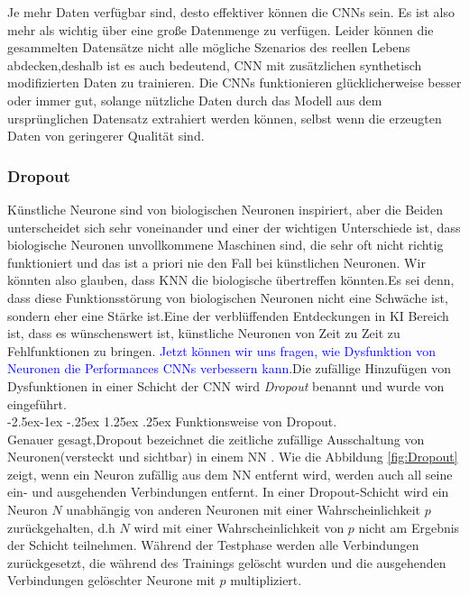 \documentclass[12pt,a4paper]{scrartcl}
\makeatletter
\numberwithin{equation}{section}
\renewcommand\paragraph{\@startsection{paragraph}{4}{\z@}%
	{-2.5ex\@plus -1ex \@minus -.25ex}%
	{1.25ex \@plus .25ex}%
	{\normalfont\normalsize\bfseries}}
\makeatother
\begin{document}
Je mehr Daten verfügbar sind, desto effektiver können die \acsp{CNN} sein. Es ist also mehr als wichtig über eine große Datenmenge zu verfügen. Leider können die gesammelten Datensätze nicht alle mögliche Szenarios des reellen Lebens abdecken,deshalb ist es auch bedeutend, \ac{CNN}  mit zusätzlichen synthetisch modifizierten Daten zu trainieren. Die \acsp{CNN} funktionieren glücklicherweise besser oder immer gut, solange nützliche Daten durch das Modell aus dem ursprünglichen Datensatz extrahiert werden können, selbst wenn die erzeugten Daten von geringerer Qualität sind.\\
 

\subsubsection{Dropout}  \label{Dropout}
Künstliche Neurone sind von biologischen Neuronen inspiriert, aber die Beiden unterscheidet sich sehr voneinander und einer der wichtigen Unterschiede ist, dass biologische Neuronen unvollkommene Maschinen sind, die sehr oft nicht richtig funktioniert und das ist a priori nie den Fall bei  künstlichen Neuronen. Wir könnten also glauben, dass \ac{KNN} die biologische übertreffen könnten.Es sei denn, dass diese Funktionsstörung von biologischen Neuronen nicht eine Schwäche ist, sondern eher eine Stärke ist.Eine der verblüffenden Entdeckungen in \ac{KI} Bereich ist, dass es wünschenswert ist, künstliche Neuronen von Zeit zu Zeit zu Fehlfunktionen zu bringen\cite{1}. \textcolor{blue}{Jetzt können wir uns fragen, wie Dysfunktion von Neuronen die Performances \acsp{CNN} verbessern kann}.Die zufällige Hinzufügen von Dysfunktionen in einer Schicht der \ac{CNN} wird \textit{Dropout} benannt und wurde von \cite[Geoffrey E. et al]{2} eingeführt.\\
\paragraph{Funktionsweise von Dropout}.\\
Genauer gesagt,Dropout bezeichnet die zeitliche zufällige Ausschaltung von Neuronen(versteckt und sichtbar)  in einem  \ac{NN} \cite{3}. Wie die Abbildung \ref{fig:Dropout} zeigt, wenn ein Neuron zufällig aus dem \ac{NN} entfernt wird, werden auch all seine ein- und ausgehenden Verbindungen entfernt.
In einer Dropout-Schicht wird ein Neuron $ \textit{N} $ unabhängig von anderen Neuronen mit einer Wahrscheinlichkeit $ {p} $ zurückgehalten, d.h $ \textit{N} $ wird mit einer Wahrscheinlichkeit von $ {p} $ nicht am Ergebnis der Schicht teilnehmen. Während der Testphase  werden alle Verbindungen zurückgesetzt, die während des Trainings gelöscht wurden und die ausgehenden Verbindungen gelöschter Neurone mit $ p $   multipliziert.
\end{document}
